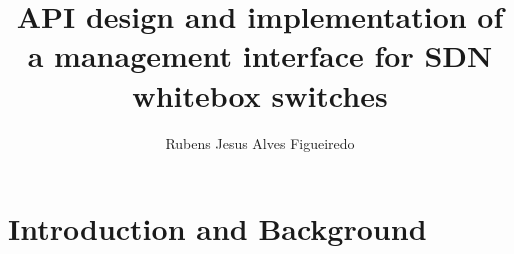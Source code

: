 \documentclass[11pt,a4paper,oneside,openright]{report}
\begin{document}
\nocite{*}


\title{API design and implementation of a management interface for SDN whitebox switches}

\author{Rubens Jesus Alves Figueiredo}

\thesisdate{\today}








\begin{Prolog}
    \tableofcontents
    \cleardoublepage
    \listoffigures
    \cleardoublepage
    \listoftables
\end{Prolog}

\StartBody

\part {Introduction and Background}
 



\end{document}
